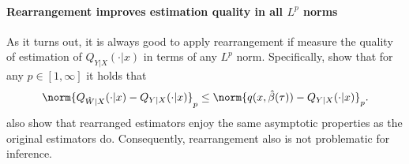  	    	
 	    	\paragraph{Rearrangement improves estimation quality in all $L^p$ norms}
 	    	 
 	    	As it turns out, it is always good to apply rearrangement if measure the quality of estimation of $Q_{Y|X}(\cdot|x)$ in terms of any $L^p$ norm. Specifically, \cite{Chernozhukov2010QuantileProbabilityCurves} show that for any $p\in [1, \infty]$ it holds that
 	    	\begin{equation}
 	    		\norm{Q_{\hat{W}|X}(\cdot|x)-Q_{Y|X}(\cdot|x)}_p\leq \norm{ q(x, \hat{\beta}(\tau))-Q_{Y|X}(\cdot|x)}_{p}.
 	    	\end{equation}
     	\cite{Chernozhukov2010QuantileProbabilityCurves} also show that rearranged estimators enjoy the same asymptotic properties as the original estimators do. Consequently,  rearrangement also is not problematic for inference.
 	    	
 	    	
  
 
   
   
 
% 
% 
% 
% 
% 
 
